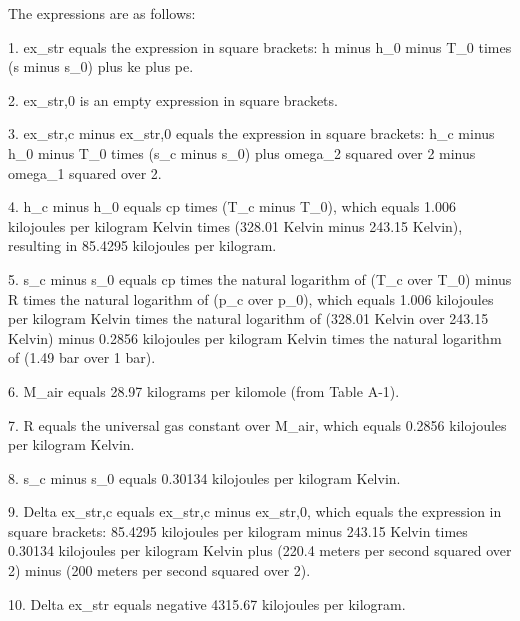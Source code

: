 The expressions are as follows:

1. ex_str equals the expression in square brackets: h minus h_0 minus T_0 times (s minus s_0) plus ke plus pe.

2. ex_str,0 is an empty expression in square brackets.

3. ex_str,c minus ex_str,0 equals the expression in square brackets: h_c minus h_0 minus T_0 times (s_c minus s_0) plus omega_2 squared over 2 minus omega_1 squared over 2.

4. h_c minus h_0 equals cp times (T_c minus T_0), which equals 1.006 kilojoules per kilogram Kelvin times (328.01 Kelvin minus 243.15 Kelvin), resulting in 85.4295 kilojoules per kilogram.

5. s_c minus s_0 equals cp times the natural logarithm of (T_c over T_0) minus R times the natural logarithm of (p_c over p_0), which equals 1.006 kilojoules per kilogram Kelvin times the natural logarithm of (328.01 Kelvin over 243.15 Kelvin) minus 0.2856 kilojoules per kilogram Kelvin times the natural logarithm of (1.49 bar over 1 bar).

6. M_air equals 28.97 kilograms per kilomole (from Table A-1).

7. R equals the universal gas constant over M_air, which equals 0.2856 kilojoules per kilogram Kelvin.

8. s_c minus s_0 equals 0.30134 kilojoules per kilogram Kelvin.

9. Delta ex_str,c equals ex_str,c minus ex_str,0, which equals the expression in square brackets: 85.4295 kilojoules per kilogram minus 243.15 Kelvin times 0.30134 kilojoules per kilogram Kelvin plus (220.4 meters per second squared over 2) minus (200 meters per second squared over 2).

10. Delta ex_str equals negative 4315.67 kilojoules per kilogram.